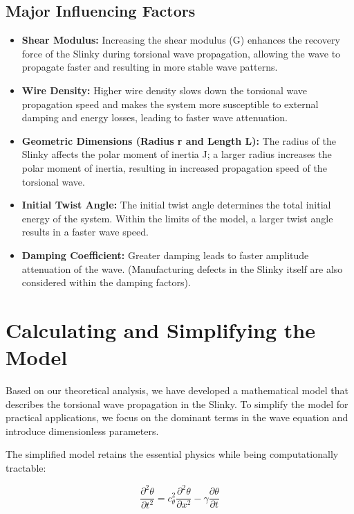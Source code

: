 \documentclass{mcmthesis}  %
\begin{document}
\subsection{Major Influencing Factors}
\begin{itemize}
    \item \textbf{Shear Modulus:} Increasing the shear modulus (G) enhances the recovery force of the Slinky during torsional wave propagation, allowing the wave to propagate faster and resulting in more stable wave patterns.
    
    \item \textbf{Wire Density:} Higher wire density slows down the torsional wave propagation speed and makes the system more susceptible to external damping and energy losses, leading to faster wave attenuation.
    
    \item \textbf{Geometric Dimensions (Radius r and Length L):} The radius of the Slinky affects the polar moment of inertia J; a larger radius increases the polar moment of inertia, resulting in increased propagation speed of the torsional wave.
    
    \item \textbf{Initial Twist Angle:} The initial twist angle determines the total initial energy of the system. Within the limits of the model, a larger twist angle results in a faster wave speed.
    
    \item \textbf{Damping Coefficient:} Greater damping leads to faster amplitude attenuation of the wave. (Manufacturing defects in the Slinky itself are also considered within the damping factors).
\end{itemize}

\section{Calculating and Simplifying the Model}  %

Based on our theoretical analysis, we have developed a mathematical model that describes the torsional wave propagation in the Slinky. To simplify the model for practical applications, we focus on the dominant terms in the wave equation and introduce dimensionless parameters.

The simplified model retains the essential physics while being computationally tractable:

\[ \frac{\partial^2 \theta}{\partial t^2} = c_{\theta}^2 \frac{\partial^2 \theta}{\partial x^2} - \gamma \frac{\partial \theta}{\partial t} \]
\end{document}
